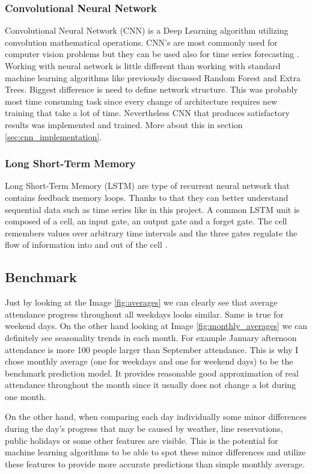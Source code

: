 \documentclass{article}
\begin{document}
\subsubsection{Convolutional Neural Network}
Convolutional Neural Network (CNN) is a Deep Learning algorithm utilizing convolution mathematical operations. CNN's are most commonly used for computer vision problems but they can be used also for time series forecasting \citep{brownlee2019cnn} \citep{granat2020cnn}. Working with neural network is little different than working with standard machine learning algorithms like previously discussed Random Forest and Extra Trees. Biggest difference is need to define network structure. This was probably most time consuming task since every change of architecture requires new training that take a lot of time. Nevertheless CNN that produces satisfactory results was implemented and trained. More about this in section \ref{sec:cnn_implementation}. 

\subsubsection{Long Short-Term Memory}
Long Short-Term Memory (LSTM) are type of recurrent neural network that contains feedback memory loops. Thanks to that they can better understand sequential data such as time series like in this project. A common LSTM unit is composed of a cell, an input gate, an output gate and a forget gate. The cell remembers values over arbitrary time intervals and the three gates regulate the flow of information into and out of the cell \citep{wiki2020lstm}. 

\subsection{Benchmark}
Just by looking at the Image \ref{fig:averages} we can clearly see that average attendance progress throughout all weekdays looks similar. Same is true for weekend days. On the other hand looking at Image \ref{fig:monthly_averages} we can definitely see seasonality trends in each month. For example January afternoon attendance is more 100 people larger than September attendance. This is why I chose monthly average (one for weekdays and one for weekend days) to be the benchmark prediction model. It provides reasonable good approximation of real attendance throughout the month since it usually does not change a lot during one month. 

On the other hand, when comparing each day individually some minor differences during the day's progress that may be caused by weather, line reservations, public holidays or some other features are visible. This is the potential for machine learning algorithms to be able to spot these minor differences and utilize these features to provide more accurate predictions than simple monthly average.
\end{document}
